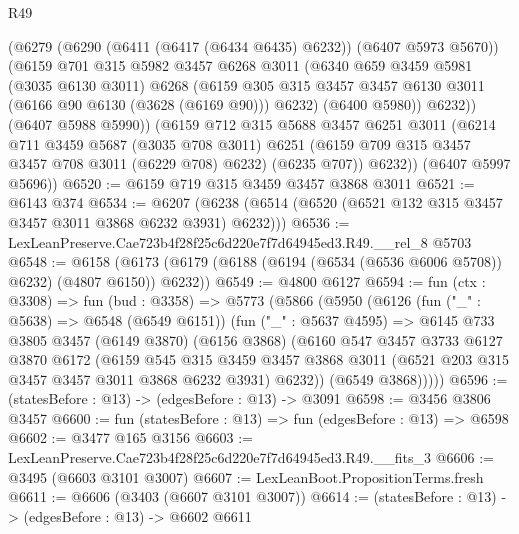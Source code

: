 \begin{lexlean}{R49}
\begin{coremodule}
          (@6279
            (@6290 (@6411 (@6417 (@6434 @6435) @6232)) (@6407 @5973 @5670))
            (@6159
              @701
              @315
              @5982
              @3457
              @6268
              @3011
              (@6340
                @659
                @3459
                @5981
                (@3035 @6130 @3011)
                @6268
                (@6159
                  @305
                  @315
                  @3457
                  @3457
                  @6130
                  @3011
                  (@6166 @90 @6130 (@3628 (@6169 @90)))
                  @6232)
                (@6400 @5980))
              @6232))
          (@6407 @5988 @5990))
        (@6159
          @712
          @315
          @5688
          @3457
          @6251
          @3011
          (@6214
            @711
            @3459
            @5687
            (@3035 @708 @3011)
            @6251
            (@6159 @709 @315 @3457 @3457 @708 @3011 (@6229 @708) @6232)
            (@6235 @707))
          @6232))
      (@6407 @5997 @5696))
@6520 := @6159 @719 @315 @3459 @3457 @3868 @3011
@6521 := @6143 @374
@6534 := @6207 (@6238 (@6514 (@6520 (@6521 @132 @315 @3457 @3457 @3011 @3868 @6232 @3931) @6232)))
@6536 := LexLeanPreserve.Cae723b4f28f25c6d220e7f7d64945ed3.R49.__rel_8 @5703
@6548 := @6158 (@6173 (@6179 (@6188 (@6194 (@6534 (@6536 @6006 @5708)) @6232) (@4807 @6150)) @6232))
@6549 := @4800 @6127
@6594 := fun (ctx : @3308) =>
  fun (bud : @3358) =>
  @5773
    (@5866
      (@5950
        (@6126
          (fun ("_" : @5638) => @6548 (@6549 @6151))
          (fun ("_" : @5637 @4595) =>
          @6145
            @733
            @3805
            @3457
            (@6149 @3870)
            (@6156 @3868)
            (@6160
              @547
              @3457
              @3733
              @6127
              @3870
              @6172
              (@6159
                @545
                @315
                @3459
                @3457
                @3868
                @3011
                (@6521 @203 @315 @3457 @3457 @3011 @3868 @6232 @3931)
                @6232))
            (@6549 @3868)))))
@6596 := (statesBefore : @13) -> (edgesBefore : @13) -> @3091
@6598 := @3456 @3806 @3457
@6600 := fun (statesBefore : @13) => fun (edgesBefore : @13) => @6598
@6602 := @3477 @165 @3156
@6603 := LexLeanPreserve.Cae723b4f28f25c6d220e7f7d64945ed3.R49.__fits_3
@6606 := @3495 (@6603 @3101 @3007)
@6607 := LexLeanBoot.PropositionTerms.fresh
@6611 := @6606 (@3403 (@6607 @3101 @3007))
@6614 := (statesBefore : @13) -> (edgesBefore : @13) -> @6602 @6611

\end{coremodule}
\end{lexlean}
